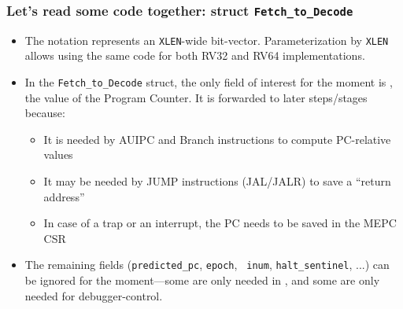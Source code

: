 \begin{frame}[fragile]
\frametitle{Let's read some code together: struct {\tt Fetch\_to\_Decode}}

\begin{center}\scriptsize


 \vspace{1ex}

 \begin{minipage}{0.8\textwidth}
  \begin{itemize}

   \item The notation  represents an {\tt XLEN}-wide
     bit-vector.  Parameterization by {\tt XLEN} allows using the same
     code for both RV32 and RV64 implementations.

   \item In the {\tt Fetch\_to\_Decode} struct, the only field of
     interest for the moment is , the value of the
     Program Counter. It is forwarded to later steps/stages because:
     \begin{itemize}\scriptsize
      \item It is needed by AUIPC and Branch instructions to compute PC-relative values
      \item It may be needed by JUMP instructions (JAL/JALR) to save a ``return address''
      \item In case of a trap or an interrupt, the PC needs to be saved in the MEPC CSR
     \end{itemize}

   \item The remaining fields ({\tt predicted\_pc}, {\tt epoch}, {\tt
     inum}, {\tt halt\_sentinel}, ...) can be ignored for the
     moment---some are only needed in {\FIFE}, and some are only
     needed for debugger-control.

  \end{itemize}

 \end{minipage}
\end{center}

\end{frame}

